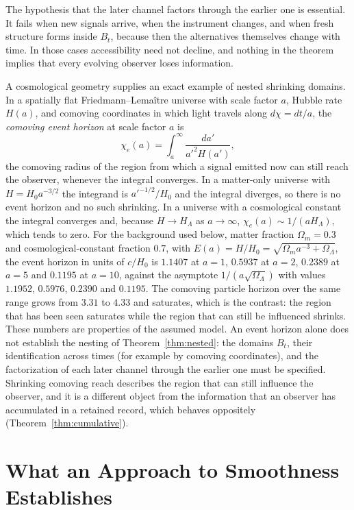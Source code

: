 \documentclass[11pt,oneside]{book}
\theoremstyle{definition}
\theoremstyle{remark}
\begin{document}
The hypothesis that the later channel factors through the earlier one is essential. It fails when new signals arrive, when the instrument changes, and when fresh structure forms inside $B_t$, because then the alternatives themselves change with time. In those cases accessibility need not decline, and nothing in the theorem implies that every evolving observer loses information.

A cosmological geometry supplies an exact example of nested shrinking domains. In a spatially flat Friedmann--Lema\^itre universe with scale factor $a$, Hubble rate $H(a)$, and comoving coordinates in which light travels along $d\chi=dt/a$, the \emph{comoving event horizon} at scale factor $a$ is
\[
\chi_e(a)=\int_a^\infty\frac{da'}{a'^2H(a')},
\]
the comoving radius of the region from which a signal emitted now can still reach the observer, whenever the integral converges. In a matter-only universe with $H=H_0a^{-3/2}$ the integrand is $a'^{-1/2}/H_0$ and the integral diverges, so there is no event horizon and no such shrinking. In a universe with a cosmological constant the integral converges and, because $H\to H_\Lambda$ as $a\to\infty$, $\chi_e(a)\sim1/(aH_\Lambda)$, which tends to zero. For the background used below, matter fraction $\Omega_m=0.3$ and cosmological-constant fraction $0.7$, with $E(a)=H/H_0=\sqrt{\Omega_ma^{-3}+\Omega_\Lambda}$, the event horizon in units of $c/H_0$ is $1.1407$ at $a=1$, $0.5937$ at $a=2$, $0.2389$ at $a=5$ and $0.1195$ at $a=10$, against the asymptote $1/(a\sqrt{\Omega_\Lambda})$ with values $1.1952$, $0.5976$, $0.2390$ and $0.1195$. The comoving particle horizon over the same range grows from $3.31$ to $4.33$ and saturates, which is the contrast: the region that has been seen saturates while the region that can still be influenced shrinks. These numbers are properties of the assumed model. An event horizon alone does not establish the nesting of Theorem~\ref{thm:nested}: the domains $B_t$, their identification across times (for example by comoving coordinates), and the factorization of each later channel through the earlier one must be specified. Shrinking comoving reach describes the region that can still influence the observer, and it is a different object from the information that an observer has accumulated in a retained record, which behaves oppositely (Theorem~\ref{thm:cumulative}).

\chapter{What an Approach to Smoothness Establishes}\label{ch:smooth}
\end{document}
